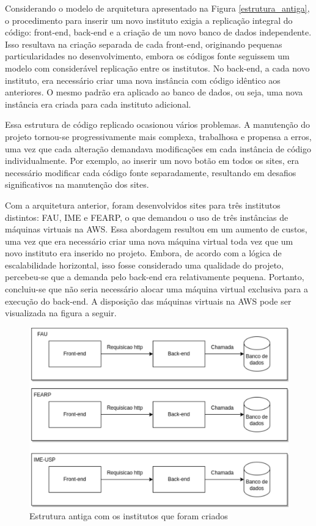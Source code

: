 Considerando o modelo de arquitetura apresentado na Figura \ref{estrutura_antiga}, o procedimento para inserir um novo instituto exigia a replicação integral do código: front-end, back-end e a criação de um novo banco de dados independente. Isso resultava na criação separada de cada front-end, originando pequenas particularidades no desenvolvimento, embora os códigos fonte seguissem um modelo com considerável replicação entre os institutos. No back-end, a cada novo instituto, era necessário criar uma nova instância com código idêntico aos anteriores. O mesmo padrão era aplicado ao banco de dados, ou seja, uma nova instância era criada para cada instituto adicional.

Essa estrutura de código replicado ocasionou vários problemas. A manutenção do projeto tornou-se progressivamente mais complexa, trabalhosa e propensa a erros, uma vez que cada alteração demandava modificações em cada instância de código individualmente. Por exemplo, ao inserir um novo botão em todos os sites, era necessário modificar cada código fonte separadamente, resultando em desafios significativos na manutenção dos sites.

Com a arquitetura anterior, foram desenvolvidos sites para três institutos distintos: FAU, IME e FEARP, o que demandou o uso de três instâncias de máquinas virtuais na AWS. Essa abordagem resultou em um aumento de custos, uma vez que era necessário criar uma nova máquina virtual toda vez que um novo instituto era inserido no projeto. Embora, de acordo com a lógica de escalabilidade horizontal, isso fosse considerado uma qualidade do projeto, percebeu-se que a demanda pelo back-end era relativamente pequena. Portanto, concluiu-se que não seria necessário alocar uma máquina virtual exclusiva para a execução do back-end. A disposição das máquinas virtuais na AWS pode ser visualizada na figura a seguir.

\begin{figure}
    \centering
    \includegraphics[width=0.75\linewidth]{figuras/arqtuitera_antiga_institutos.pdf}
    \caption{Estrutura antiga com os institutos que foram criados}
    \label{fig:arquitetura-antiga}
\end{figure}

